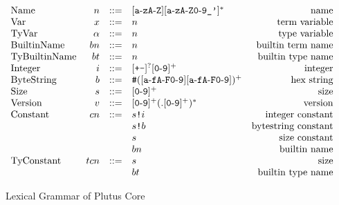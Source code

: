 \documentclass[../main.tex]{subfiles}
\begin{document}
\begin{figure*}[t]
    \centering
    \[\begin{array}{lrclr}
        
        \textrm{Name}        & n      & ::= & [\texttt{a}\!\hyphen{}\!\texttt{z}\texttt{A}\!\hyphen{}\!\texttt{Z}][\texttt{a}\!\hyphen{}\!\texttt{zA}\!\hyphen{}\!\texttt{Z0}\!\hyphen{}\!\texttt{9\_'}]^*   & \textrm{name}\\
        
        \textrm{Var}           & x      & ::= & n & \textrm{term variable}\\
        \textrm{TyVar}         & \alpha & ::= & n & \textrm{type variable}\\
        \textrm{BuiltinName}   & bn     & ::= & n & \textrm{builtin term name}\\
        \textrm{TyBuiltinName} & bt     & ::= & n & \textrm{builtin type name}\\
        
        \textrm{Integer} & i  & ::= & [\texttt{+-}]^?[\texttt{0}\!\hyphen{}\!\texttt{9}]^+ & \textrm{integer}\\
        
        \textrm{ByteString}   & b  & ::= & \texttt{\#}([\texttt{a}\!\hyphen{}\!\texttt{fA}\!\hyphen{}\!\texttt{F0}\!\hyphen{}\!\texttt{9}][\texttt{a}\!\hyphen{}\!\texttt{fA}\!\hyphen{}\!\texttt{F0}\!\hyphen{}\!\texttt{9}])^+ & \textrm{hex string}\\
        
        \textrm{Size} & s  & ::= & [\texttt{0}\!\hyphen{}\!\texttt{9}]^+ & \textrm{size}\\
        
        \textrm{Version} & v & ::= & [\texttt{0}\!\hyphen{}\!\texttt{9}]^+(.[\texttt{0}\!\hyphen{}\!\texttt{9}]^+)^* & \textrm{version}\\
        
        \textrm{Constant} & cn & ::= & \sizedBuiltin{s}{i} & \textrm{integer constant}\\
                          &    &     & \sizedBuiltin{s}{b} & \textrm{bytestring constant}\\
                          &    &     & s & \textrm{size constant}\\
                          &    &     & bn & \textrm{builtin name}\\
        \textrm{TyConstant} & tcn & ::= & s & \textrm{size}\\
                            &     &     & bt & \textrm{builtin type name}\\
        
    \end{array}\]
    \caption{Lexical Grammar of Plutus Core}
    \label{fig:Plutus_core_lexical_grammar}
\end{figure*}
\end{document}
